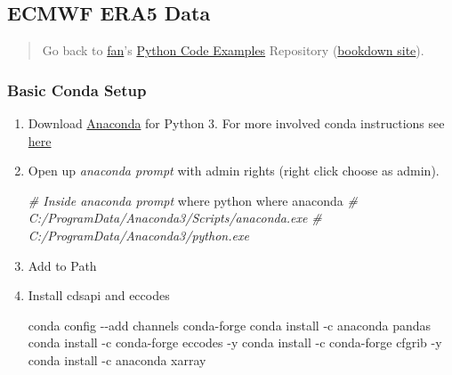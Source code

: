\documentclass[
]{book}
\newenvironment{Shaded}{\begin{snugshade}}{\end{snugshade}}
\newcommand{\CommentTok}[1]{\textcolor[rgb]{0.56,0.35,0.01}{\textit{#1}}}
\newcommand{\ExtensionTok}[1]{#1}
\newcommand{\NormalTok}[1]{#1}
\begin{document}
\hypertarget{ecmwf-era5-data}{%
\subsection{ECMWF ERA5 Data}\label{ecmwf-era5-data}}

\begin{quote}
Go back to \href{http://fanwangecon.github.io/}{fan}'s \href{https://fanwangecon.github.io/pyfan/}{Python Code Examples} Repository (\href{https://fanwangecon.github.io/pyfan/bookdown}{bookdown site}).
\end{quote}

\hypertarget{basic-conda-setup}{%
\subsubsection{Basic Conda Setup}\label{basic-conda-setup}}

\begin{enumerate}
\def\labelenumi{\arabic{enumi}.}
\item
  Download \href{https://www.anaconda.com/products/individual}{Anaconda} for Python 3. For more involved conda instructions see \href{https://fanwangecon.github.io/Tex4Econ/nontex/install/windows/fn_installations.html}{here}
\item
  Open up \emph{anaconda prompt} with admin rights (right click choose as admin).

\begin{Shaded}
\begin{Highlighting}[]
\CommentTok{\# Inside anaconda prompt}
\ExtensionTok{where}\NormalTok{ python}
\ExtensionTok{where}\NormalTok{ anaconda}
\CommentTok{\# C:/ProgramData/Anaconda3/Scripts/anaconda.exe}
\CommentTok{\# C:/ProgramData/Anaconda3/python.exe}
\end{Highlighting}
\end{Shaded}
\item
  Add to Path
\item
  Install cdsapi and eccodes

\begin{Shaded}
\begin{Highlighting}[]
\ExtensionTok{conda}\NormalTok{ config {-}{-}add channels conda{-}forge}
\ExtensionTok{conda}\NormalTok{ install {-}c anaconda pandas}
\ExtensionTok{conda}\NormalTok{ install {-}c conda{-}forge eccodes {-}y}
\ExtensionTok{conda}\NormalTok{ install {-}c conda{-}forge cfgrib {-}y}
\ExtensionTok{conda}\NormalTok{ install {-}c anaconda xarray}
\end{Highlighting}
\end{Shaded}
\end{enumerate}
\end{document}
